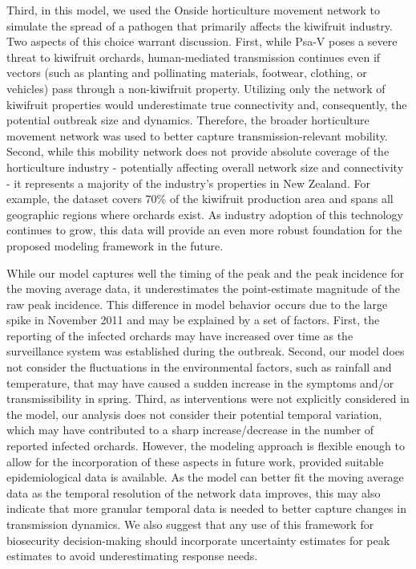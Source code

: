 \documentclass[aps,physrev,reprint,superscriptaddress]{revtex4-1}
\begin{document}
Third, in this model, we used the Onside horticulture movement network to simulate the spread of a pathogen that primarily affects the kiwifruit industry. Two aspects of this choice warrant discussion. First, while Psa-V poses a severe threat to kiwifruit orchards, human-mediated transmission continues even if vectors (such as planting and pollinating materials, footwear, clothing, or vehicles) pass through a non-kiwifruit property. Utilizing only the network of kiwifruit properties would underestimate true connectivity and, consequently, the potential outbreak size and dynamics. Therefore, the broader horticulture movement network was used to better capture transmission-relevant mobility. Second, while this mobility network does not provide absolute coverage of the horticulture industry - potentially affecting overall network size and connectivity - it represents a majority of the industry's properties in New Zealand. For example, the dataset covers 70\% of the kiwifruit production area and spans all geographic regions where orchards exist. As industry adoption of this technology continues to grow, this data will provide an even more robust foundation for the proposed modeling framework in the future.

 While our model captures well the timing of the peak and the peak incidence for the moving average data, it underestimates the point-estimate magnitude of the raw peak incidence. This difference in model behavior occurs due to the large spike in November 2011 and may be explained by a set of factors. First, the reporting of the infected orchards may have increased over time as the surveillance system was established during the outbreak. Second, our model does not consider the fluctuations in the environmental factors, such as rainfall and temperature, that may have caused a sudden increase in the symptoms and/or transmissibility in spring. Third, as interventions were not explicitly considered in the model, our analysis does not consider their potential temporal variation, which may have contributed to a sharp increase/decrease in the number of reported infected orchards. However, the modeling approach is flexible enough to allow for the incorporation of these aspects in future work, provided suitable epidemiological data is available. As the model can better fit the moving average data as the temporal resolution of the network data improves, this may also indicate that more granular temporal data is needed to better capture changes in transmission dynamics. We also suggest that any use of this framework for biosecurity decision-making should incorporate uncertainty estimates for peak estimates to avoid underestimating response needs.
\end{document}
